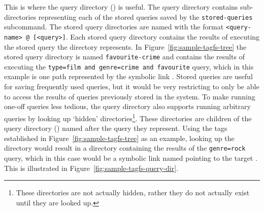 This is where the query directory () is useful. The query directory
contains sub-directories representing each of the stored queries saved by the
\texttt{stored-queries} subcommand. The stored query directories are named with
the format \texttt{<query-name> @ [<query>]}. Each stored query directory
contains the results of executing the stored query the directory represents. In
Figure~\ref{fig:sample-tagfs-tree} the stored query directory is named
\texttt{favourite-crime} and contains the results of executing the
\texttt{type=film and genre=crime and favourite} query, which in this example
is one path represented by the symbolic link . Stored
queries are useful for saving frequently used queries, but it would be very
restricting to only be able to access the results of queries previously stored
in the system. To make running one-off queries less tedious, the query
directory also supports running arbitrary queries by looking up
`hidden' directories\footnote{These directories are not actually hidden, rather
they do not actually exist until they are looked up.}. These directories are
children of the query directory () named after the query they
represent. Using the tags established in Figure~\ref{fig:sample-tagfs-tree} as
an example, looking up the directory  would result in a
directory containing the results of the \texttt{genre=rock} query, which in
this case would be a symbolic link named  pointing
to the target . This is illustrated in Figure~\ref{fig:sample-tagfs-query-dir}.

